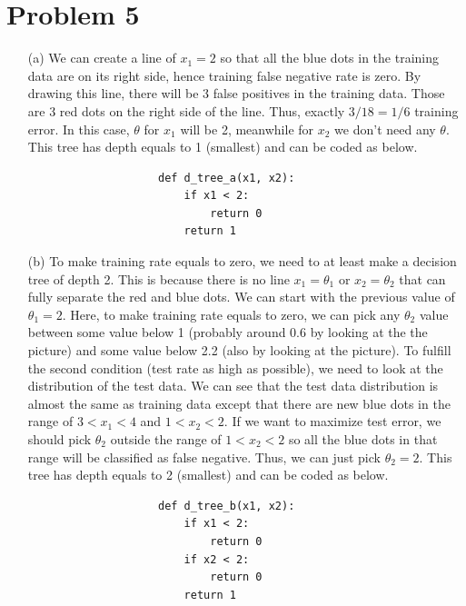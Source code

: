 \documentclass[twoside]{homework}
\begin{document}
\section*{Problem 5}
\begin{itemize}
    \item[(a)] We can create a line of $x_1=2$ so that all the blue dots in the training data are on its right side, hence training false negative rate is zero. By drawing this line, there will be 3 false positives in the training data. Those are 3 red dots on the right side of the line. Thus, exactly $3/18=1/6$ training error. In this case, $\theta$ for $x_1$ will be 2, meanwhile for $x_2$ we don't need any $\theta$. This tree has depth equals to 1 (smallest) and can be coded as below.
                \begin{verbatim}
                    def d_tree_a(x1, x2):
                        if x1 < 2:
                            return 0
                        return 1
                \end{verbatim}
    \item[(b)] To make training rate equals to zero, we need to at least make a decision tree of depth 2. This is because there is no line $x_1=\theta_1$ or $x_2=\theta_2$ that can fully separate the red and blue dots. We can start with the previous value of $\theta_1=2$. Here, to make training rate equals to zero, we can pick any $\theta_2$ value between some value below 1 (probably around 0.6 by looking at the the picture) and some value below 2.2 (also by looking at the picture). \newline\newline
    To fulfill the second condition (test rate as high as possible), we need to look at the distribution of the test data. We can see that the test data distribution is almost the same as training data except that there are new blue dots in the range of $3<x_1<4$ and $1<x_2<2$. If we want to maximize test error, we should pick $\theta_2$ outside the range of $1<x_2<2$ so all the blue dots in that range will be classified as false negative. Thus, we can just pick $\theta_2=2$. This tree has depth equals to 2 (smallest) and can be coded as below.
                \begin{verbatim}
                    def d_tree_b(x1, x2):
                        if x1 < 2:
                            return 0
                        if x2 < 2:
                            return 0
                        return 1
                \end{verbatim}
\end{itemize}
\end{document}
